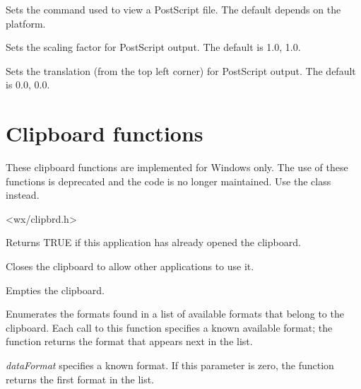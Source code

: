 Sets the command used to view a PostScript file. The default depends on the platform.



Sets the scaling factor for PostScript output. The default is 1.0, 1.0.



Sets the translation (from the top left corner) for PostScript output. The default is 0.0, 0.0.

\section{Clipboard functions}\label{clipsboard}

These clipboard functions are implemented for Windows only. The use of these functions
is deprecated and the code is no longer maintained. Use the 
class instead.


<wx/clipbrd.h>



Returns TRUE if this application has already opened the clipboard.



Closes the clipboard to allow other applications to use it.



Empties the clipboard.



Enumerates the formats found in a list of available formats that belong
to the clipboard. Each call to this  function specifies a known
available format; the function returns the format that appears next in
the list. 

{\it dataFormat} specifies a known format. If this parameter is zero,
the function returns the first format in the list. 

